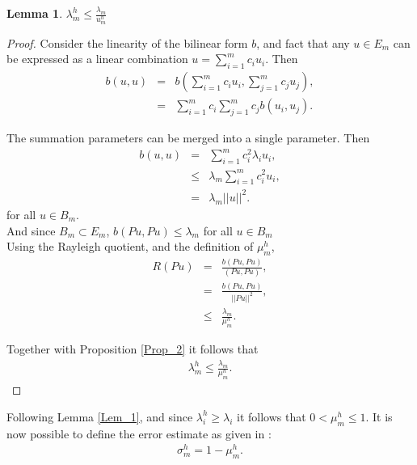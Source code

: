 \documentclass[../../main.tex]{subfiles}
\begin{document}
\newtheorem{Lem_1}{Lemma} \label{Lem_1}
\begin{Lem_1}
	$\displaystyle \lambda_{m}^{h} \leq \frac{\lambda_{m}}{u_{m}^{h}}$
\end{Lem_1}
\begin{proof}
	Consider the linearity of the bilinear form $b$, and fact that any $u \in E_m$ can be expressed as a linear combination $u = \sum_{i=1}^{m} c_{i}u_{i}$. Then
	\begin{eqnarray*}
	b(u,u) &=& b\left(\sum_{i=1}^{m} c_{i}u_{i},\sum_{j=1}^{m} c_{j}u_{j}\right),\\
			&=& \sum_{i=1}^{m} c_{i}\sum_{j=1}^{m} c_{j} b(u_{i},u_{j}).
	\end{eqnarray*}

	The summation parameters can be merged into a single parameter. Then
	\begin{eqnarray*}
		b(u,u)  & = & \sum_{i=1}^{m} c_{i}^{2} \lambda_{i} u_i,\\
				& \leq & \lambda_{m}\sum_{i=1}^{m} c_{i}^{2} u_i,\\
				& = & \lambda_{m}||u||^2.
	\end{eqnarray*} for all $u \in B_m$.\\
	
	
	And since $B_{m} \subset E_{m}$, $b(Pu,Pu) \leq \lambda_{m}$ for all $u\in B_{m}$\\
	
	Using the Rayleigh quotient, and the definition of $\mu_{m}^{h}$, 
	\begin{eqnarray*}
		R(Pu) &=& \frac{b(Pu,Pu)}{(Pu,Pu)},\\
			&=& \frac{b(Pu,Pu)}{||Pu||^{2}},\\
			&\leq & \frac{\lambda_{m}}{\mu_{m}^{h}}.
	\end{eqnarray*}

	Together with Proposition \ref{Prop_2} it follows that
	\begin{eqnarray*}
		\lambda_{m}^{h} \leq \frac{\lambda_{m}}{\mu_{m}^{h}}.
	\end{eqnarray*}
\end{proof}

Following Lemma \ref{Lem_1}, and since $\lambda_{i}^{h} \geq \lambda_{i}$ it follows that $0 < \mu_{m}^{h} \leq 1$. It is now possible to define the error estimate as given in \cite{SF73}:
\begin{eqnarray*}
	\sigma_{m}^{h} = 1 - \mu_{m}^{h}.
\end{eqnarray*}
\end{document}
